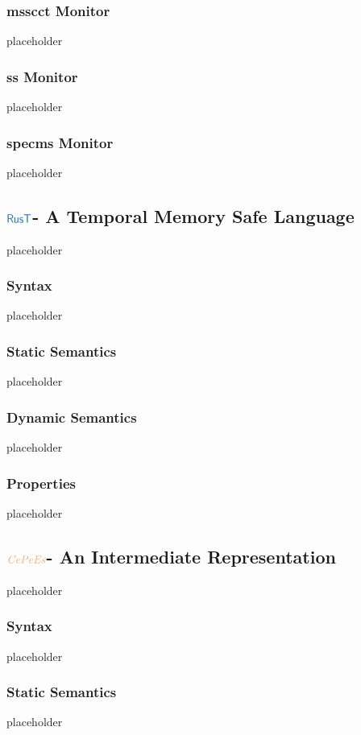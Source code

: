 \documentclass[a4paper,12pt]{article}
\begin{document}
\subsubsection{\gls*{msscct} Monitor}\label{subsubsec-mon-msscct}
placeholder
\subsubsection{\gls*{ss} Monitor}\label{subsubsec-mon-spec}
placeholder
\subsubsection{\gls*{specms} Monitor}\label{subsubsec-mon-specms}
placeholder


\subsection{$\src{RusT}$- A Temporal Memory Safe Language}\label{subsec-rust}
placeholder
\subsubsection{Syntax}\label{subsec-rust-syntax}
placeholder
\subsubsection{Static Semantics}\label{subsec-rust-static}
placeholder
\subsubsection{Dynamic Semantics}\label{subsec-rust-dynamic}
placeholder
\subsubsection{Properties}\label{subsec-rust-properties}
placeholder


\subsection{$\irl{CePeEs}$- An Intermediate Representation}\label{subsec-cepees}
placeholder
\subsubsection{Syntax}\label{subsec-cepees-syntax}
placeholder
\subsubsection{Static Semantics}\label{subsec-cepees-static}
placeholder
\end{document}
